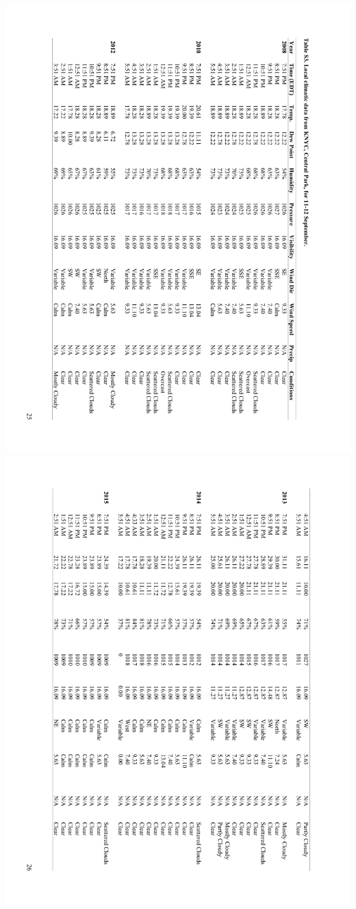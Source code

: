 \documentclass[a4paper, twoside]{templates/ociamthesis}
\begin{document}
\includegraphics[width=1\linewidth]{pdf_chapters/lights/lights_supp_crop_Part29}
\includegraphics[width=1\linewidth]{pdf_chapters/lights/lights_supp_crop_Part30}
\end{document}
